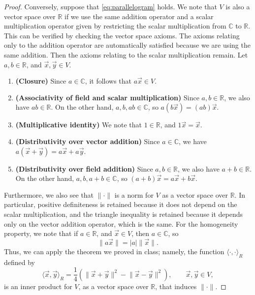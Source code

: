 \documentclass{homework}
\begin{document}
\begin{proof}
		Conversely, suppose that \eqref{eq:parallelogram} holds. We note that $V$ is also a vector space over $\mathbb{R}$ if we use the same addition operator and a scalar multiplication operator given by restricting the scalar multiplication from $\mathbb{C}$ to $\mathbb{R}$. This can be verified by checking the vector space axioms. The axioms relating only to the addition operator are automatically satisfied because we are using the same addition. Then the axioms relating to the scalar multiplication remain. Let $a,b \in \mathbb{R}$, and $\vec{x}, \vec{y} \in V$.
		\begin{enumerate}
			\item \textbf{(Closure)} Since $a \in \mathbb{C}$, it follows that $a\vec{x} \in V$.
			\item \textbf{(Associativity of field and scalar multiplication)} Since $a, b \in \mathbb{R}$, we also have $ab \in \mathbb{R}$. On the other hand, $a,b,ab \in \mathbb{C}$, so $a(b\vec{x}) = (ab)\vec{x}$.
			\item \textbf{(Multiplicative identity)} We note that $1 \in \mathbb{R}$, and $1\vec{x} = \vec{x}$.
			\item \textbf{(Distributivity over vector addition)} Since $a \in \mathbb{C}$, we have $a(\vec{x} + \vec{y}) = a\vec{x} + a\vec{y}$.
			\item \textbf{(Distributivity over field addition)} Since $a, b \in \mathbb{R}$, we also have $a+b\in\mathbb{R}$. On the other hand, $a,b,a+b\in\mathbb{C}$, so $(a+b)\vec{x} = a\vec{x} + b\vec{x}$.
		\end{enumerate}
		Furthermore, we also see that $\lVert\cdot\rVert$ is a norm for $V$ as a vector space over $\mathbb{R}$. In particular, positive definiteness is retained because it does not depend on the scalar multiplication, and the triangle inequality is retained because it depends only on the vector addition operator, which is the same. For the homogeneity property, we note that if $a \in \mathbb{R}$, and $\vec{x} \in V$, then $a \in \mathbb{C}$, so
		\begin{equation*}
			\lVert a\vec{x}\rVert = |a|\lVert\vec{x}\rVert.
		\end{equation*}
		Thus, we can apply the theorem we proved in class; namely, the function $\langle\cdot,\cdot\rangle_R$ defined by
		\begin{equation*}
			\langle\vec{x},\vec{y}\rangle_R = \frac{1}{4}\left(\lVert\vec{x} + \vec{y}\rVert^2 - \lVert\vec{x} - \vec{y}\rVert^2\right), \qquad \vec{x},\vec{y}\in V,
		\end{equation*}
		is an inner product for $V$, as a vector space over $\mathbb{R}$, that induces $\lVert\cdot\rVert$.
		

\end{proof}
\end{document}
